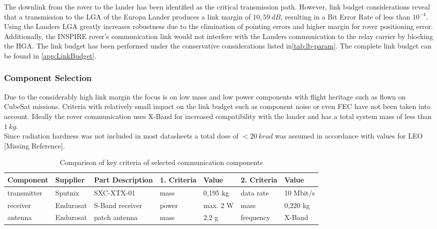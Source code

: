 The downlink from the rover to the lander has been identified as the critical transmission path. However, link budget considerations reveal that a transmission to the LGA of the Europa Lander produces a link margin of $10,59\ dB$, resulting in a Bit Error Rate of less than $10^{-4}$.\\

Using the Landers LGA greatly increases robustness due to the elimination of pointing errors and higher margin for rover positioning error. Additionally, the INSPIRE rover’s communication link would not interfere with the Landers communication to the relay carrier by blocking the HGA. The link budget has been performed under the conservative considerations listed in\autoref{tab:lb-param}. The complete link budget can be found in \autoref{app:LinkBudget}. 

\subsubsection{Component Selection}

Due to the considerably high link margin the focus is on low mass and low power components with flight heritage such as flown on CubeSat missions. Criteria with relatively small impact on the link budget such as component noise or even FEC have not been taken into account. Ideally the rover communication uses X-Band for increased compatibility with the lander and has a total system mass of less than $1\ kg$. \\
Since radiation hardness was not included in most datasheets a total dose of $<20\ krad$ was assumed in accordance with values for LEO [Missing Reference].

\begin{table}[h]
\centering
\begin{tabular}{lll|ll|ll}
Component   & Supplier  & Part Description     & 1. Criteria   & Value    & 2. Criteria & Value          \\ \hline\hline
transmitter & Sputnix   & SXC-XTX-01           & mass          & 0,195 kg & data rate   & 10 Mbit/s \\
receiver    & Endurosat & S-Band receiver      & power         & max. 2 W & mass        & 0,220 kg       \\
antenna     & Endurosat & patch antenna & mass          & 2,2 g    & frequency   & X-Band         \\ \hline
\end{tabular}
\caption{Comparison of key criteria of selected communication components }
\label{tab:ComCompComp}
\end{table}

